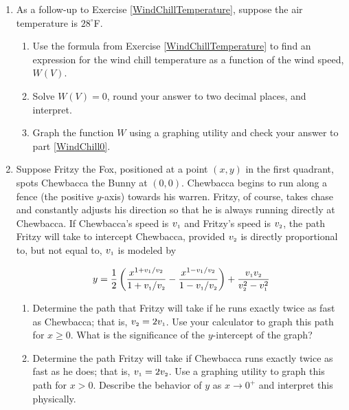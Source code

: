 \documentclass{ximera}
\begin{document}
\begin{enumerate}
\begin{enumerate}
\end{enumerate}

\item  As a follow-up to Exercise \ref{WindChillTemperature}, suppose the air temperature is $28^{\circ}$F.  

\begin{enumerate}

\item Use the formula from Exercise \ref{WindChillTemperature} to find an expression for the wind chill temperature as a function of the wind speed, $W(V)$.  

\item  \label{WindChill0} Solve $W(V) = 0$, round your answer to two decimal places,  and interpret.  

\item  Graph the function $W$ using a graphing utility and check your answer to part \ref{WindChill0}. 


\end{enumerate}


\item \label{pursuitfurther} Suppose Fritzy the Fox, positioned at a point $(x,y)$ in the first quadrant, spots Chewbacca the Bunny at $(0,0)$.   Chewbacca begins to run along a fence (the positive $y$-axis) towards his warren.  Fritzy, of course, takes chase and constantly adjusts his direction so that he is always running directly at Chewbacca.  If Chewbacca's speed is $v_{\mbox{\tiny$1$}}$ and  Fritzy's speed is $v_{\mbox{\tiny$2$}}$, the path Fritzy will take to intercept Chewbacca, provided $v_{\mbox{\tiny$2$}}$ is directly proportional to, but not equal to, $v_{\mbox{\tiny$1$}}$ is modeled by

\[ y = \dfrac{1}{2} \left(\dfrac{x^{1+ v_{1}/v_{2}}}{1+v_{\mbox{\tiny$1$}}/v_{\mbox{\tiny$2$}}}- \dfrac{x^{1-v_{\mbox{\tiny$1$}}/v_{\mbox{\tiny$2$}}}}{1-v_{\mbox{\tiny$1$}}/v_{\mbox{\tiny$2$}}}\right) + \dfrac{v_{\mbox{\tiny$1$}} v_{\mbox{\tiny$2$}}}{v_{\mbox{\tiny$2$}}^2-v_{\mbox{\tiny$1$}}^2} \]

\begin{enumerate}

\item  Determine the path that Fritzy will take if he runs exactly twice as fast as Chewbacca;  that is, $v_{\mbox{\tiny$2$}} = 2v_{\mbox{\tiny$1$}}$. Use your calculator to graph this path for $x \geq 0$.  What is the significance of the $y$-intercept of the graph?

\item  Determine the path Fritzy will take if Chewbacca runs exactly twice as fast as he does;  that is, $v_{\mbox{\tiny$1$}} = 2v_{\mbox{\tiny$2$}}$.  Use a graphing utility to graph this path for $x > 0$.  Describe the behavior of $y$ as $x \rightarrow 0^{+}$ and interpret this physically.


\end{enumerate}
\end{enumerate}
\end{document}
